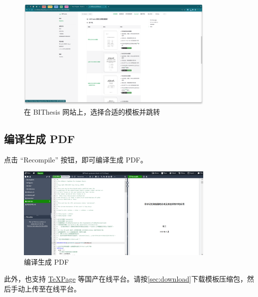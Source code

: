 
\vspace{\fill}
\clearpage

\begin{figure}[H]
  \begin{center}
    \includegraphics[width=0.85\textwidth]{imgs/overleaf-choose-template.png}
  \end{center}
  \caption{在 BIThesis 网站上，选择合适的模板并跳转}
  \label{fig:overleaf-template}
\end{figure}

\vspace{\fill}
\subsection{编译生成 PDF}

点击 ``Recompile'' 按钮，即可编译生成 PDF。

\begin{figure}[H]
  \begin{center}
    \includegraphics[width=0.85\textwidth]{imgs/overleaf-compile.png}
  \end{center}
  \caption{编译生成 PDF}
  \label{fig:overleaf-recompile}
\end{figure}

\vspace{\fill}

此外，\BIThesis 也支持 \href{https://www.texpage.com/zh/}{TeXPage} 等国产在线平台。请按\autoref{sec:download}下载模板压缩包，然后手动上传至在线平台。
